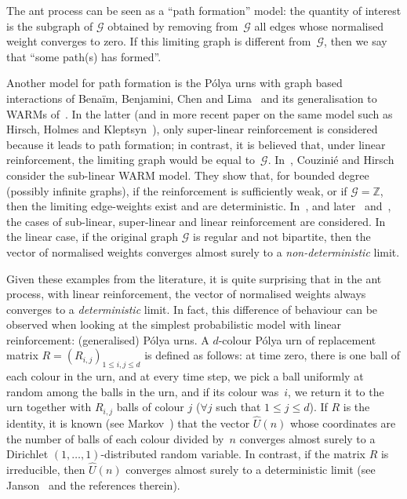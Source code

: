 \documentclass[JEP,XML,SOM,Unicode,NoFloatCountersInSection,published]{cedram}
\let\mathcal\mathscr
\numberwithin{equation}{section}
\theoremstyle{definition}
\begin{document}
The ant process can be seen as a ``path formation'' model:
the quantity of interest is the subgraph of $\mathcal G$
obtained by removing from~$\mathcal G$ all edges whose normalised weight converges to zero.
If this limiting graph is different from~$\mathcal G$, then we say that ``some path(s) has formed''.

Another model for path formation is the Pólya urns with graph based interactions
of Benaïm, Benjamini, Chen and Lima~\cite{BBCL}
and its generalisation to WARMs of~\cite{WARM}.
In the latter (and in more recent paper on the same model such as Hirsch, Holmes and Kleptsyn~\cite{WARM_new}),
only super-linear reinforcement is considered because it leads to path formation;
in contrast, it is believed that, under linear reinforcement,
the limiting graph would be equal to~$\mathcal G$.
{In~\cite{CH21}, Couzinié and Hirsch consider the sub-linear WARM model.
They show that, for bounded degree (possibly infinite graphs),
if the reinforcement is sufficiently weak, or if $\mathcal G = \mathbb Z$,
then the limiting edge-weights exist and are deterministic.}
In~\cite{BBCL}, and later~\cite{CL} and~\cite{Lima},
the cases of sub-linear, super-linear and linear reinforcement are considered.
In the linear case, if the original graph $\mathcal G$ is regular and not bipartite,
then the vector of normalised weights converges almost surely
to a \emph{non-deterministic} limit.

Given these examples from the literature, it is quite surprising that in the ant process, with linear
reinforcement, the vector of normalised weights always converges to a \emph{deterministic} limit.
In fact, this difference of behaviour can be observed when looking at the simplest probabilistic model with linear reinforcement: (generalised) Pólya urns.
A $d$-colour Pólya urn of replacement matrix $R = (R_{i,j})_{1\leq i,j\leq d}$ is defined as follows:
at time zero, there is one ball of each colour in the urn, and
at every time step, we pick a ball uniformly at random among the balls in the urn, and if its colour was~$i$, we return it to the urn together with $R_{i,j}$ balls of colour $j$ ($\forall j$  such that $1\leq j\leq d$).
If $R$ is the identity, it is known (see Markov~\cite{Markov}) that the vector $\hat U(n)$ whose coordinates are the number of balls of each colour divided by~$n$ converges almost surely to a Dirichlet $(1, \ldots, 1)$-distributed random variable.
In contrast, if the matrix $R$ is irreducible, then $\hat U(n)$ converges almost surely to a deterministic limit (see Janson~\cite{Janson04} and the references therein).
\end{document}
